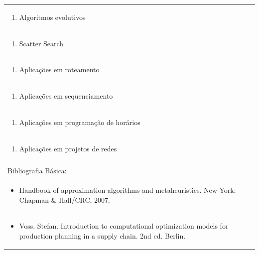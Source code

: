 \documentclass[11pt]{article}
\begin{document}
\begin{center}
\begin{longtable}{|p{4cm}|p{4cm}|p{4cm}|p{4cm}|}
\multicolumn{4}{|p{\dimexpr 16cm + 6\tabcolsep\relax}|}{\begin{enumerate}[start=12]\item Algoritmos evolutivos\end{enumerate}}\\
\multicolumn{4}{|p{\dimexpr 16cm + 6\tabcolsep\relax}|}{\begin{enumerate}[start=13]\item Scatter Search\end{enumerate}}\\
\multicolumn{4}{|p{\dimexpr 16cm + 6\tabcolsep\relax}|}{\begin{enumerate}[start=14]\item Aplicações em roteamento\end{enumerate}}\\
\multicolumn{4}{|p{\dimexpr 16cm + 6\tabcolsep\relax}|}{\begin{enumerate}[start=15]\item Aplicações em sequenciamento\end{enumerate}}\\
\multicolumn{4}{|p{\dimexpr 16cm + 6\tabcolsep\relax}|}{\begin{enumerate}[start=16]\item Aplicações em programação de horários\end{enumerate}}\\
\multicolumn{4}{|p{\dimexpr 16cm + 6\tabcolsep\relax}|}{\begin{enumerate}[start=17]\item Aplicações em projetos de redes\end{enumerate}}\\
\multicolumn{4}{|p{\dimexpr 16cm + 6\tabcolsep\relax}|}{}\\
\hline
\multicolumn{4}{|p{16cm}|}{Bibliografia Básica:}\\*
\multicolumn{4}{|p{\dimexpr 16cm + 6\tabcolsep\relax}|}{\begin{itemize}\item Handbook of approximation algorithms and metaheuristics. New York: Chapman \& Hall/CRC, 2007.\end{itemize}}\\
\multicolumn{4}{|p{\dimexpr 16cm + 6\tabcolsep\relax}|}{\begin{itemize}\item Voss, Stefan. Introduction to computational optimization models for production planning in a supply chain. 2nd ed. Berlin.\end{itemize}}\\

\end{longtable}
\end{center}
\end{document}
